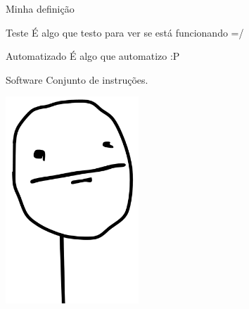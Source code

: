\begin{frame}
  \begin{center}
    \Huge Minha definição
  \end{center}
\end{frame}

\begin{frame}[label=minha-definicao]{\subsecname}
  \begin{block}{Teste}
    É algo que testo para ver se está funcionando =/
  \end{block}
  \pause

  \begin{block}{Automatizado}
    É algo que automatizo :P
  \end{block}
  \pause

  \begin{block}{Software}
    Conjunto de instruções.
  \end{block}
\end{frame}

\begin{frame}{\subsecname}
  \begin{center}
    \includegraphics[width=5cm]{images/poker-face}
  \end{center}
\end{frame}

